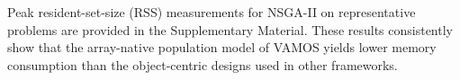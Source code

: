 \documentclass[journal]{IEEEtran}
\newcommand{\VAMOS}{VAMOS}
\begin{document}



%
%


Peak resident-set-size (RSS) measurements for NSGA-II on representative problems are provided in the Supplementary Material. These results consistently show that the array-native population model of \VAMOS{} yields lower memory consumption than the object-centric designs used in other frameworks.
\end{document}
